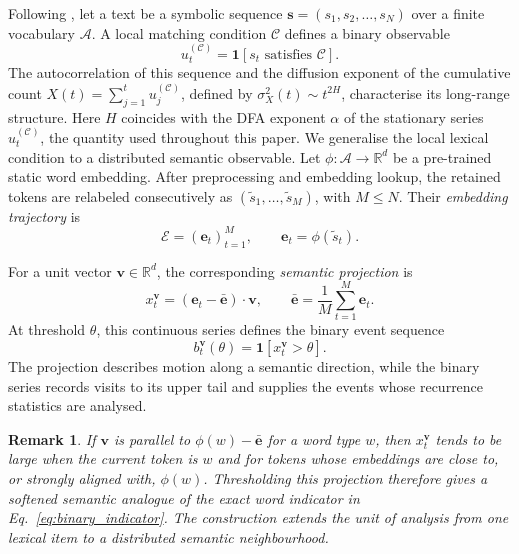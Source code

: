 \documentclass[12pt,a4paper]{article}
\newtheorem{remark}{Remark}
\newcommand{\et}{\mathbf{e}_t}
\newcommand{\ebar}{\bar{\mathbf{e}}}
\newcommand{\R}{\mathbb{R}}
\begin{document}
Following \citet{Altmann2012}, let a text be a symbolic sequence
$\mathbf{s}=(s_1,s_2,\ldots,s_N)$ over a finite vocabulary
$\mathcal{A}$.
A local matching condition $\mathcal{C}$ defines a binary observable
\begin{equation}
  u_t^{(\mathcal{C})}=\mathbf{1}[s_t\text{ satisfies }\mathcal{C}].
  \label{eq:binary_indicator}
\end{equation}
The autocorrelation of this sequence and the diffusion exponent of the
cumulative count $X(t)=\sum_{j=1}^t u_j^{(\mathcal{C})}$, defined by
$\sigma_X^2(t)\sim t^{2H}$, characterise its long-range structure.
Here $H$ coincides with the DFA exponent $\alpha$ of the stationary
series $u_t^{(\mathcal{C})}$, the quantity used throughout this paper.
We generalise the local lexical condition to a distributed semantic
observable.
Let $\phi:\mathcal{A}\to\R^d$ be a pre-trained static word embedding.
After preprocessing and embedding lookup, the retained tokens are
relabeled consecutively as $(\tilde s_1,\ldots,\tilde s_M)$, with
$M\leq N$.
Their \emph{embedding trajectory} is
\begin{equation}
  \mathcal{E}=(\et)_{t=1}^M,
  \qquad
  \et=\phi(\tilde s_t).
  \label{eq:trajectory}
\end{equation}

For a unit vector $\mathbf{v}\in\R^d$, the corresponding
\emph{semantic projection} is
\begin{equation}
  x_t^{\mathbf{v}}=(\et-\ebar)\cdot\mathbf{v},
  \qquad
  \ebar=\frac{1}{M}\sum_{t=1}^M\et.
  \label{eq:projection}
\end{equation}
At threshold $\theta$, this continuous series defines the binary event
sequence
\begin{equation}
  b_t^{\mathbf{v}}(\theta)
  =\mathbf{1}\!\left[x_t^{\mathbf{v}}>\theta\right].
  \label{eq:binary_from_proj}
\end{equation}
The projection describes motion along a semantic direction, while the
binary series records visits to its upper tail and supplies the events
whose recurrence statistics are analysed.

\begin{remark}
  If $\mathbf{v}$ is parallel to $\phi(w)-\ebar$ for a word type $w$,
  then $x_t^{\mathbf{v}}$ tends to be large when the current token is
  $w$ and for tokens whose embeddings are close to, or strongly aligned
  with, $\phi(w)$.
  Thresholding this projection therefore gives a softened semantic
  analogue of the exact word indicator in
  Eq.~\eqref{eq:binary_indicator}.
  The construction extends the unit of analysis from one lexical item to
  a distributed semantic neighbourhood.
\end{remark}
\end{document}

